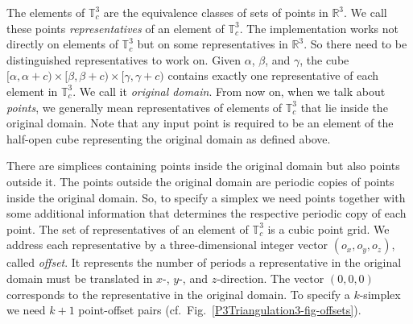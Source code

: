 The elements of $\mathbb T_c^3$ are the equivalence classes of sets of
points in $\mathbb R^3$. We call these points \textit{representatives}
of an element of $\mathbb 
T_c^3$. The implementation works not directly on elements of $\mathbb
T_c^3$ but on some representatives in $\mathbb R^3$. So there need to
be distinguished representatives to work on. Given $\alpha$, $\beta$,
and $\gamma$, the cube
$[\alpha,\alpha+c)\times[\beta,\beta+c)\times[\gamma,\gamma+c)$ 
contains exactly one representative of each element in $\mathbb
T_c^3$. We call it \emph{original domain}. From now on, when we talk
about \textit{points}, we generally mean representatives of elements
of $\mathbb T_c^3$ that lie inside the original domain. Note that any
input point is required to be an element of the half-open cube
representing the original domain as defined above.

There are simplices containing points inside the original domain but
also points outside it. The points outside the original domain are
periodic copies of points inside the original domain. So, to
specify a simplex we need points together with some additional
information that determines the respective periodic copy of each point. 
The set of representatives of an element of $\mathbb T_c^3$ is a cubic
point grid. We address each representative by a three-dimensional
integer vector $(o_x,o_y,o_z)$, called \emph{offset}. It
represents the number of periods a representative in the original
domain must be translated in $x$-, $y$-, and $z$-direction.
The vector $(0,0,0)$ corresponds to the representative in the original
domain. To specify a $k$-simplex we need $k+1$ point-offset pairs
(cf.\ Fig.~\ref{P3Triangulation3-fig-offsets}). 

